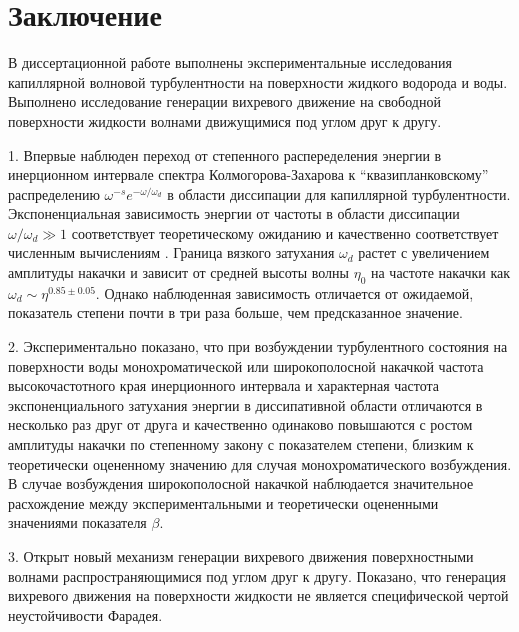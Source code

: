 \chapter*{Заключение}						%

В диссертационной работе выполнены экспериментальные исследования капиллярной волновой турбулентности на поверхности жидкого водорода и воды. Выполнено исследование генерации вихревого движение на свободной поверхности жидкости волнами движущимися под углом друг к другу.

1. Впервые наблюден переход от степенного распеределения энергии в инерционном интервале спектра Колмогорова-Захарова к “квазипланковскому” распределению $\omega^{-s}e^{-\omega/\omega_d}$ в области диссипации для капиллярной турбулентности. Экспоненциальная зависимость энергии от частоты в области диссипации $\omega/\omega_d \gg 1$ соответствует теоретическому ожиданию и качественно соответствует численным вычислениям \cite{Ryzhenkova1990}. Граница вязкого затухания $\omega_d$ растет с увеличением амплитуды накачки и зависит от средней высоты волны $\eta_0$ на частоте накачки как $\omega_d \sim \eta^{0.85 \pm 0.05}$. Однако наблюденная зависимость отличается от ожидаемой, показатель степени почти в три раза больше, чем предсказанное значение.

2. Экспериментально показано, что при возбуждении турбулентного состояния на поверхности воды монохроматической или широкополосной накачкой частота высокочастотного края инерционного интервала и характерная частота экспоненциального затухания энергии в диссипативной области отличаются в несколько раз друг от друга и качественно одинаково повышаются с ростом амплитуды накачки по степенному закону с показателем степени, близким к теоретически оцененному значению для случая монохроматического возбуждения. В случае возбуждения широкополосной накачкой наблюдается значительное расхождение между экспериментальными и теоретически оцененными значениями показателя $\beta$.

3. Открыт новый механизм генерации вихревого движения поверхностными волнами распространяющимися под углом друг к другу. Показано, что генерация вихревого движения на поверхности жидкости не является специфической чертой неустойчивости Фарадея.

